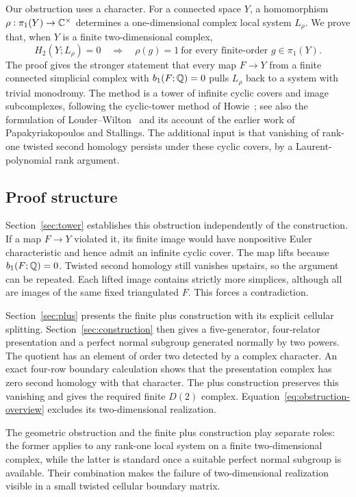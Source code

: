 Our obstruction uses a character. For a connected space $Y$, a
homomorphism $\rho:\pi_1(Y)\to\mathbb C^\times$ determines a
one-dimensional complex local system $L_\rho$. We prove that, when
$Y$ is a finite two-dimensional complex,
\begin{equation}\label{eq:obstruction-overview}
 H_2(Y;L_\rho)=0
 \quad\Longrightarrow\quad
 \rho(g)=1\ \text{for every finite-order }g\in\pi_1(Y).
\end{equation}
The proof gives the stronger statement that every map $F\to Y$ from
a finite connected simplicial complex with $b_1(F;\mathbb Q)=0$ pulls $L_\rho$
back to a system with trivial monodromy. The method is a tower of
infinite cyclic covers and image subcomplexes, following the cyclic-tower
method of Howie~\cite{Howie81Pairs}; see also the formulation of
Louder--Wilton~\cite[Section~3]{LouderWilton17} and its account of
the earlier work of Papakyriakopoulos and Stallings. The additional input
is that vanishing of rank-one twisted second homology persists under
these cyclic covers, by a Laurent-polynomial rank argument.

\subsection{Proof structure}

Section~\ref{sec:tower} establishes this obstruction independently
of the construction. If a map $F\to Y$ violated it, its finite image
would have nonpositive Euler characteristic and hence admit an
infinite cyclic cover. The map lifts because $b_1(F;\mathbb Q)=0$.
Twisted second homology still vanishes upstairs, so the argument
can be repeated. Each lifted image contains strictly more simplices,
although all are images of the same fixed triangulated $F$. This
forces a contradiction.

Section~\ref{sec:plus} presents the finite plus construction with
its explicit cellular splitting. Section~\ref{sec:construction}
then gives a five-generator, four-relator presentation and a perfect
normal subgroup generated normally by two powers. The quotient has
an element of order two detected by a complex character. An exact
four-row boundary calculation shows that the presentation complex
has zero second homology with that character. The plus construction
preserves this vanishing and gives the required finite $D(2)$
complex. Equation~\eqref{eq:obstruction-overview} excludes its
two-dimensional realization.

The geometric obstruction and the finite plus construction play separate
roles: the former applies to any rank-one local system on a finite
two-dimensional complex, while the latter is standard once a suitable
perfect normal subgroup is available. Their combination makes the
failure of two-dimensional realization visible in a small twisted
cellular boundary matrix.
